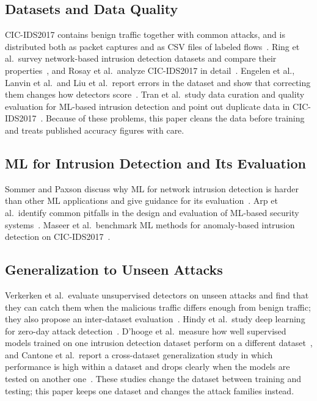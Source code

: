 \documentclass[conference]{IEEEtran}
\newif\ifshowtodo
\newcommand{\todo}[1]{\ifshowtodo{\color{red}\textbf{[TODO: #1]}}\fi}
\begin{document}
\subsection{Datasets and Data Quality}
CIC-IDS2017 contains benign traffic together with common attacks, and is distributed both as packet captures and as CSV files of labeled flows~\cite{sharafaldin2018}. Ring et al.\ survey network-based intrusion detection datasets and compare their properties~\cite{ring2019}, and Rosay et al.\ analyze CIC-IDS2017 in detail~\cite{rosay2022}. Engelen et al., Lanvin et al.\ and Liu et al.\ report errors in the dataset and show that correcting them changes how detectors score~\cite{engelen2021,lanvin2023,liu2022}. Tran et al.\ study data curation and quality evaluation for ML-based intrusion detection and point out duplicate data in CIC-IDS2017~\cite{tran2022}. \todo{confirm which quality problems they report after reading} Because of these problems, this paper cleans the data before training and treats published accuracy figures with care.

\subsection{ML for Intrusion Detection and Its Evaluation}
Sommer and Paxson discuss why ML for network intrusion detection is harder than other ML applications and give guidance for its evaluation~\cite{sommer2010}. Arp et al.\ identify common pitfalls in the design and evaluation of ML-based security systems~\cite{arp2022}. \todo{list the pitfalls that are relevant to this paper after reading} Maseer et al.\ benchmark ML methods for anomaly-based intrusion detection on CIC-IDS2017~\cite{maseer2021}. \todo{note which evaluation protocol and which results they report}

\subsection{Generalization to Unseen Attacks}
Verkerken et al.\ evaluate unsupervised detectors on unseen attacks and find that they can catch them when the malicious traffic differs enough from benign traffic; they also propose an inter-dataset evaluation~\cite{verkerken2022}. Hindy et al.\ study deep learning for zero-day attack detection~\cite{hindy2020}. D'hooge et al.\ measure how well supervised models trained on one intrusion detection dataset perform on a different dataset~\cite{dhooge2020}, \todo{confirm the datasets and the size of the drop after reading} and Cantone et al.\ report a cross-dataset generalization study in which performance is high within a dataset and drops clearly when the models are tested on another one~\cite{cantone2024}. \todo{confirm the reported numbers after reading} These studies change the dataset between training and testing; this paper keeps one dataset and changes the attack families instead.
\end{document}
